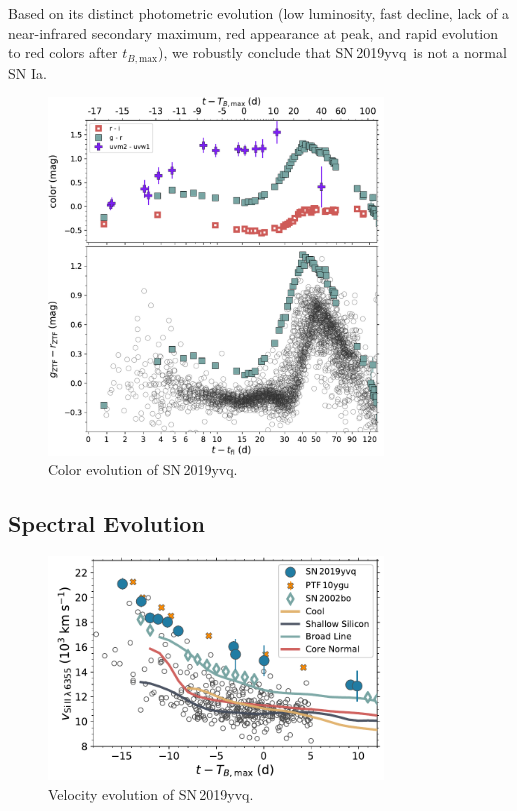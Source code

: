 \documentclass[twocolumn]{aastex63}
\newcommand{\tbmax}{$t_{B,\mathrm{max}}$}
\newcommand{\sn}{SN\,2019yvq}
\begin{document}
Based on its distinct photometric evolution (low luminosity, fast decline,
lack of a near-infrared secondary maximum, red appearance at peak, and rapid
evolution to red colors after \tbmax), we robustly conclude that \sn\ is not
a normal SN Ia.

\begin{figure}
    \centering
    \includegraphics[width=3.5in]{./figures/P48_colors.pdf}
    \caption{Color evolution of \sn.}
    \label{fig:colors}
\end{figure}

\subsection{Spectral Evolution}\label{sec:spec}

\begin{figure}
    \centering
    \includegraphics[width=3.5in]{./figures/vel_evolution.pdf}
    \caption{Velocity evolution of \sn.}
    \label{fig:vel_evo}
\end{figure}
\end{document}
